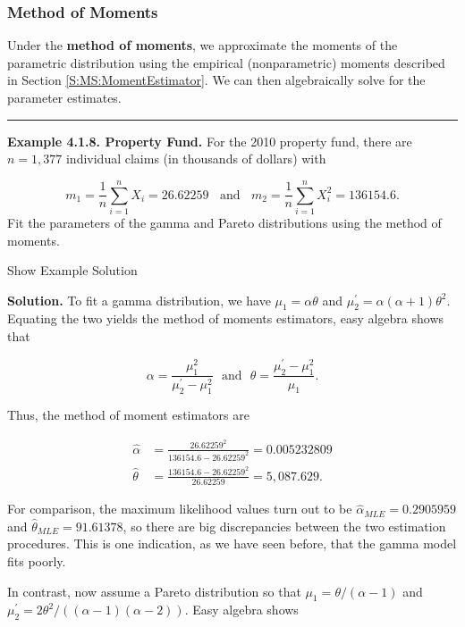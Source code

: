 \documentclass[]{book}
\theoremstyle{definition}
\theoremstyle{definition}
\theoremstyle{definition}
\theoremstyle{remark}
\begin{document}
\subsubsection{Method of Moments}\label{method-of-moments}

Under the \textbf{method of moments}, we approximate the moments of the
parametric distribution using the empirical (nonparametric) moments
described in Section \ref{S:MS:MomentEstimator}. We can then
algebraically solve for the parameter estimates.

\begin{center}\rule{0.5\linewidth}{\linethickness}\end{center}

\textbf{Example 4.1.8. Property Fund.} For the 2010 property fund, there
are \(n=1,377\) individual claims (in thousands of dollars) with

\[m_1 = \frac{1}{n} \sum_{i=1}^n X_i = 26.62259 \ \ \ \
\text{and} \ \ \ \
 m_2 = \frac{1}{n} \sum_{i=1}^n X_i^2 = 136154.6 .\] Fit the parameters
of the gamma and Pareto distributions using the method of moments.

Show Example Solution

\hypertarget{toggleExampleSelect.1.8}{}
\textbf{Solution.} To fit a gamma distribution, we have
\(\mu_1 = \alpha \theta\) and
\(\mu_2^{\prime} = \alpha(\alpha+1) \theta^2\). Equating the two yields
the method of moments estimators, easy algebra shows that

\[\alpha = \frac{\mu_1^2}{\mu_2^{\prime}-\mu_1^2}  \ \ \ \text{and} \ \ \  \theta = \frac{\mu_2^{\prime}-\mu_1^2}{\mu_1}.\]

Thus, the method of moment estimators are

\[\begin{aligned}
\hat{\alpha} &=  \frac{26.62259^2}{136154.6-26.62259^2} = 0.005232809 \\
\hat{\theta} &=  \frac{136154.6-26.62259^2}{26.62259} = 5,087.629.
\end{aligned}\]

For comparison, the maximum likelihood values turn out to be
\(\hat{\alpha}_{MLE} = 0.2905959\) and
\(\hat{\theta}_{MLE} = 91.61378\), so there are big discrepancies
between the two estimation procedures. This is one indication, as we
have seen before, that the gamma model fits poorly.

In contrast, now assume a Pareto distribution so that
\(\mu_1 = \theta/(\alpha -1)\) and
\(\mu_2^{\prime} = 2\theta^2/((\alpha-1)(\alpha-2) )\). Easy algebra
shows
\end{document}
